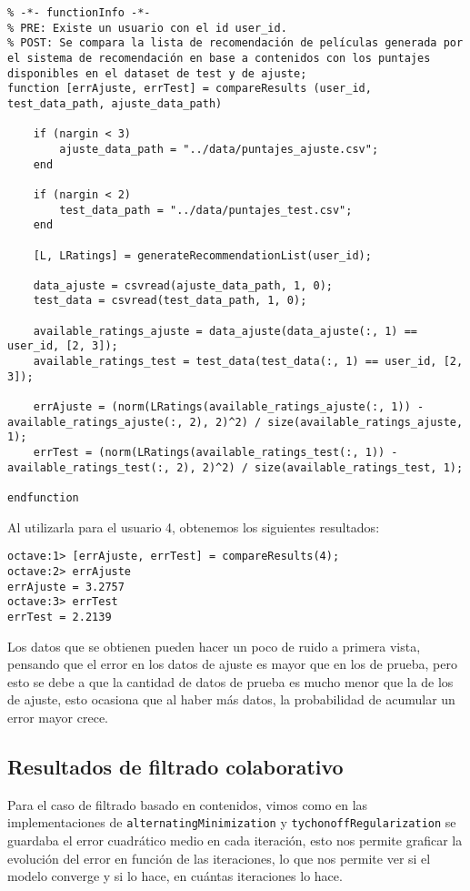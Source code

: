 \documentclass[12pt,a4paper]{article}
\begin{document}
\begin{lstlisting}
% -*- functionInfo -*-
% PRE: Existe un usuario con el id user_id.
% POST: Se compara la lista de recomendación de películas generada por el sistema de recomendación en base a contenidos con los puntajes disponibles en el dataset de test y de ajuste;
function [errAjuste, errTest] = compareResults (user_id, test_data_path, ajuste_data_path)

    if (nargin < 3)
        ajuste_data_path = "../data/puntajes_ajuste.csv";
    end

    if (nargin < 2)
        test_data_path = "../data/puntajes_test.csv";
    end

    [L, LRatings] = generateRecommendationList(user_id);

    data_ajuste = csvread(ajuste_data_path, 1, 0);
    test_data = csvread(test_data_path, 1, 0);

    available_ratings_ajuste = data_ajuste(data_ajuste(:, 1) == user_id, [2, 3]);
    available_ratings_test = test_data(test_data(:, 1) == user_id, [2, 3]);

    errAjuste = (norm(LRatings(available_ratings_ajuste(:, 1)) - available_ratings_ajuste(:, 2), 2)^2) / size(available_ratings_ajuste, 1);
    errTest = (norm(LRatings(available_ratings_test(:, 1)) - available_ratings_test(:, 2), 2)^2) / size(available_ratings_test, 1);

endfunction
\end{lstlisting}

Al utilizarla para el usuario 4, obtenemos los siguientes resultados:

\begin{lstlisting}
octave:1> [errAjuste, errTest] = compareResults(4);
octave:2> errAjuste
errAjuste = 3.2757
octave:3> errTest
errTest = 2.2139
\end{lstlisting}

Los datos que se obtienen pueden hacer un poco de ruido a primera vista, pensando que el error en los datos de ajuste es mayor que en los de prueba, pero esto se debe a que la cantidad de datos de prueba es mucho menor que la de los de ajuste, esto ocasiona que al haber más datos, la probabilidad de acumular un error mayor crece.

\subsection*{Resultados de filtrado colaborativo}
Para el caso de filtrado basado en contenidos, vimos como en las implementaciones de \texttt{alternatingMinimization} y \texttt{tychonoffRegularization} se guardaba el error cuadrático medio en cada iteración, esto nos permite graficar la evolución del error en función de las iteraciones, lo que nos permite ver si el modelo converge y si lo hace, en cuántas iteraciones lo hace.
\end{document}
